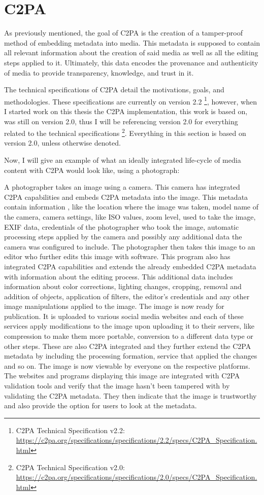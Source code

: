 \section{C2PA\label{c2pa}}

As previously mentioned, the goal of C2PA is the creation of a tamper-proof method of embedding metadata into media. This metadata is supposed to contain all relevant information about the creation of said media as well as all the editing steps applied to it. Ultimately, this data encodes the provenance and authenticity of media to provide transparency, knowledge, and trust in it.

The technical specifications of C2PA detail the motivations, goals, and methodologies. These specifications are currently on version 2.2 \footnote{C2PA Technical Specification v2.2: \url{https://c2pa.org/specifications/specifications/2.2/specs/C2PA_Specification.html}}, however, when I started work on this thesis the C2PA implementation, this work is based on, was still on version 2.0, thus I will be referencing version 2.0 for everything related to the technical specifications \footnote{C2PA Technical Specification v2.0: \url{https://c2pa.org/specifications/specifications/2.0/specs/C2PA_Specification.html}}. Everything in this section is based on version 2.0, unless otherwise denoted.

Now, I will give an example of what an ideally integrated life-cycle of media content with C2PA would look like, using a photograph:

A photographer takes an image using a camera. This camera has integrated C2PA capabilities and embeds C2PA metadata into the image. This metadata contain information , like the location where the image was taken, model name of the camera, camera settings, like ISO values, zoom level, used to take the image, EXIF data, credentials of the photographer who took the image, automatic processing steps applied by the camera and possibly any additional data the camera was configured to include. The photographer then takes this image to an editor who further edits this image with software. This program also has integrated C2PA capabilities and extends the already embedded C2PA metadata with information about the editing process. This additional data includes information about color corrections, lighting changes, cropping, removal and addition of objects, application of filters, the editor's credentials and any other image manipulations applied to the image. The image is now ready for publication. It is uploaded to various social media websites and each of these services apply modifications to the image upon uploading it to their servers, like compression to make them more portable, conversion to a different data type or other steps. These are also C2PA integrated and they further extend the C2PA metadata by including the processing formation, service that applied the changes and so on. The image is now viewable by everyone on the respective platforms. The websites and programs displaying this image are integrated with C2PA validation tools and verify that the image hasn't been tampered with by validating the C2PA metadata. They then indicate that the image is trustworthy and also provide the option for users to look at the metadata.

